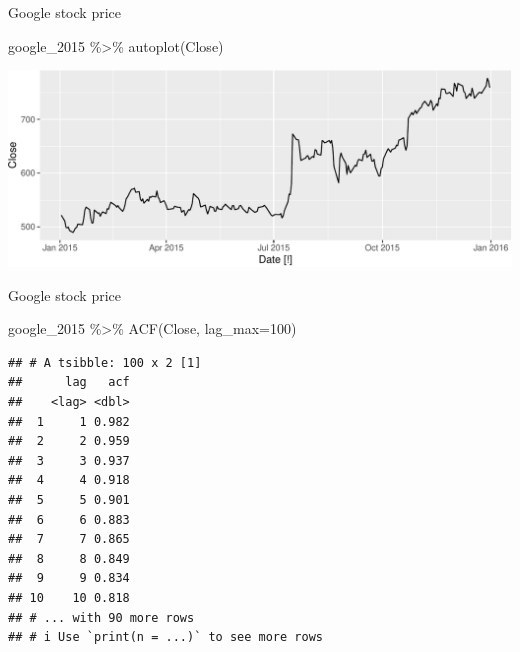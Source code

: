 \documentclass[14pt,ignorenonframetext,aspectratio=169]{beamer}
\newenvironment{Shaded}{\begin{snugshade}}{\end{snugshade}}
\newcommand{\AttributeTok}[1]{\textcolor[rgb]{0.77,0.63,0.00}{#1}}
\newcommand{\DecValTok}[1]{\textcolor[rgb]{0.00,0.00,0.81}{#1}}
\newcommand{\FunctionTok}[1]{\textcolor[rgb]{0.00,0.00,0.00}{#1}}
\newcommand{\NormalTok}[1]{#1}
\newcommand{\SpecialCharTok}[1]{\textcolor[rgb]{0.00,0.00,0.00}{#1}}
\renewenvironment{Shaded}{\color{black}\begin{snugshade}\color{black}}{\end{snugshade}}
\renewenvironment{Shaded}{\color{black}\fontsize{10}{10}\sf\begin{snugshade}\color{black}}{\end{snugshade}}
\begin{document}
\begin{frame}[fragile]{Google stock price}
\protect\hypertarget{google-stock-price-1}{}
\fontsize{10}{10}\sf

\begin{Shaded}
\begin{Highlighting}[]
\NormalTok{google\_2015 }\SpecialCharTok{\%\textgreater{}\%} \FunctionTok{autoplot}\NormalTok{(Close)}
\end{Highlighting}
\end{Shaded}

\includegraphics{2-tsgraphics_files/figure-beamer/unnamed-chunk-29-1.pdf}
\end{frame}

\begin{frame}[fragile]{Google stock price}
\protect\hypertarget{google-stock-price-2}{}
\fontsize{10}{10}\sf

\begin{Shaded}
\begin{Highlighting}[]
\NormalTok{google\_2015 }\SpecialCharTok{\%\textgreater{}\%}
  \FunctionTok{ACF}\NormalTok{(Close, }\AttributeTok{lag\_max=}\DecValTok{100}\NormalTok{)}
\end{Highlighting}
\end{Shaded}

\begin{verbatim}
## # A tsibble: 100 x 2 [1]
##      lag   acf
##    <lag> <dbl>
##  1     1 0.982
##  2     2 0.959
##  3     3 0.937
##  4     4 0.918
##  5     5 0.901
##  6     6 0.883
##  7     7 0.865
##  8     8 0.849
##  9     9 0.834
## 10    10 0.818
## # ... with 90 more rows
## # i Use `print(n = ...)` to see more rows
\end{verbatim}
\end{frame}
\end{document}
